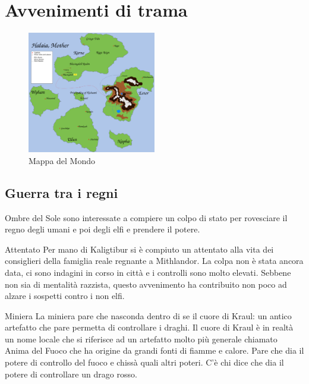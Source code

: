 \section{Avvenimenti di trama}
\begin{figure}[h]
  \centering
  \includegraphics[width=0.5\textwidth]{../../drawings/WorldMap/rect181.png}
  \caption{Mappa del Mondo}
  \label{fig:worldmap}
\end{figure}
\subsection{Guerra tra i regni}
Ombre del Sole sono interessate a compiere un colpo di stato per rovesciare il regno degli umani e
poi degli elfi e prendere il potere.

\begin{commentbox}{Attentato}
  Per mano di Kaligtibur si \`e compiuto un attentato alla vita dei consiglieri della
  famiglia reale regnante a Mithlandor. La colpa non \`e stata ancora data, ci sono
  indagini in corso in citt\`a e i controlli sono molto elevati. Sebbene non sia di
  mentalit\`a razzista, questo avvenimento ha contribuito non poco ad alzare
  i sospetti contro i non elfi.
\end{commentbox}
\begin{commentbox}{Miniera}
  La miniera pare che nasconda dentro di se il cuore di Kraul: un antico artefatto che
  pare permetta di controllare i draghi. Il cuore di Kraul \`e in realt\`a un nome
  locale che si riferisce ad un artefatto molto pi\`u generale chiamato Anima del
  Fuoco che ha origine da grandi fonti di fiamme e calore. Pare che dia il potere di
  controllo del fuoco e chiss\`a quali altri poteri. C'\`e chi dice che dia
  il potere di controllare un drago rosso.
\end{commentbox}